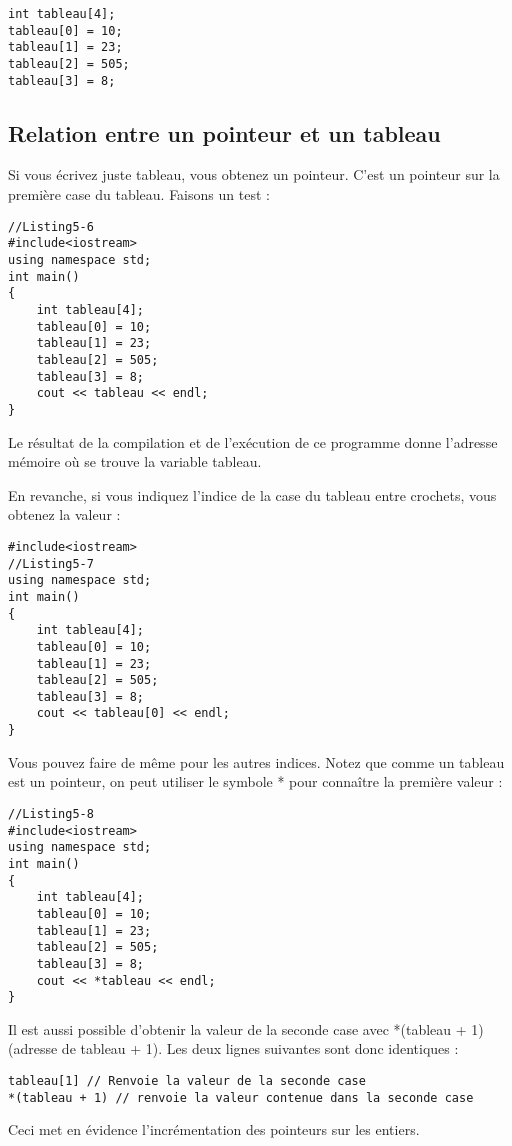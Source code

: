 \documentclass[a4paper, oneside,11pt]{book}
\begin{document}
\begin{lstlisting}
int tableau[4];
tableau[0] = 10;
tableau[1] = 23;
tableau[2] = 505;
tableau[3] = 8;
\end{lstlisting}

\subsection{Relation entre un pointeur et un tableau}


Si vous \'ecrivez juste tableau, vous obtenez un pointeur. C'est un pointeur sur la premi\`ere case du tableau. Faisons un test :

\begin{lstlisting}
//Listing5-6
#include<iostream>
using namespace std;
int main()
{
    int tableau[4];
    tableau[0] = 10;
    tableau[1] = 23;
    tableau[2] = 505;
    tableau[3] = 8;
    cout << tableau << endl;
}
\end{lstlisting}

Le r\'esultat de la compilation et de l'ex\'ecution de ce programme donne l'adresse m\'emoire où se trouve la variable tableau.


En revanche, si vous indiquez l'indice de la case du tableau entre crochets, vous obtenez la valeur :

\begin{lstlisting}
#include<iostream>
//Listing5-7
using namespace std;
int main()
{
    int tableau[4];
    tableau[0] = 10;
    tableau[1] = 23;
    tableau[2] = 505;
    tableau[3] = 8;
    cout << tableau[0] << endl;
}
\end{lstlisting}


Vous pouvez faire de  m\^eme pour les autres indices. Notez que comme un tableau est un pointeur, on peut utiliser le symbole * pour conna\^itre la premi\`ere valeur :

\begin{lstlisting}
//Listing5-8
#include<iostream>
using namespace std;
int main()
{
    int tableau[4];
    tableau[0] = 10;
    tableau[1] = 23;
    tableau[2] = 505;
    tableau[3] = 8;
    cout << *tableau << endl;
}
\end{lstlisting}


Il est aussi possible d'obtenir la valeur de la seconde case avec *(tableau + 1) (adresse de tableau + 1).
Les deux lignes suivantes sont donc identiques :


\begin{lstlisting}
tableau[1] // Renvoie la valeur de la seconde case
*(tableau + 1) // renvoie la valeur contenue dans la seconde case
\end{lstlisting}
Ceci met en \'evidence l'incr\'ementation des pointeurs sur les entiers.
\end{document}
